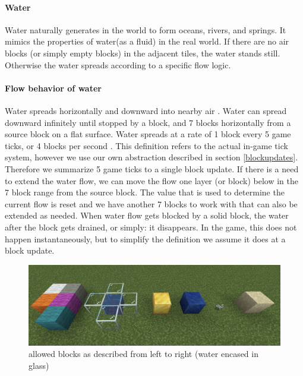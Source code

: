 \pagebreak
\paragraph{Water}
Water naturally generates in the world to form oceans, rivers, and springs. \cite{minecraftfandom:water}
It mimics the properties of water(as a fluid) in the real world.
If there are no air blocks (or simply empty blocks) in the adjacent tiles,
the water stands still. Otherwise the water spreads according to a specific flow logic.

\paragraph{Flow behavior of water}
Water spreads horizontally and downward into nearby air . Water can spread downward infinitely until stopped by a block, and 7 blocks horizontally from a source block on a flat surface. \newline Water spreads at a rate of 1 block every 5 game ticks, or 4 blocks per second \cite{minecraftfandom:waterspread}.\newline
\newline This definition refers to the actual in-game tick system, however we use our own abstraction described in section \ref{blockupdates}.
Therefore we summarize 5 game ticks to a single block update.
\newline If there is a need to extend the water flow, we can move the flow one layer (or block) below in the 7 block range from the source block.
The value that is used to determine the current flow is reset and we have another 7 blocks to work with that can also be extended as needed.
\newline When water flow gets blocked by a solid block, the water after the block gets drained, or simply: it disappears. In the game, this does not happen instantaneously, but to simplify the definition we assume it does at a block update.

\begin{figure}[h]
    \centering
    \includegraphics[width=\linewidth]{images/allowed blocks.png}
    \caption{allowed blocks as described from left to right (water encased in glass)}
    \label{fig:allowedblocks}
\end{figure}

